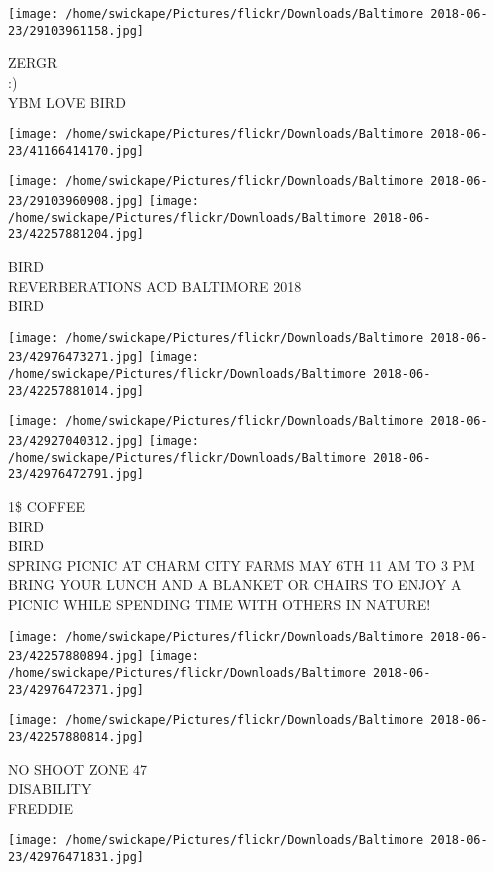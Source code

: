 \documentclass[10pt,letterpaper]{article}
\begin{document}
\texttt{[image: /home/swickape/Pictures/flickr/Downloads/Baltimore 2018-06-23/29103961158.jpg]}

ZERGR\\
:)\\
YBM LOVE BIRD
\pagebreak

\texttt{[image: /home/swickape/Pictures/flickr/Downloads/Baltimore 2018-06-23/41166414170.jpg]}

\vspace{0.25in}
\texttt{[image: /home/swickape/Pictures/flickr/Downloads/Baltimore 2018-06-23/29103960908.jpg]}
\texttt{[image: /home/swickape/Pictures/flickr/Downloads/Baltimore 2018-06-23/42257881204.jpg]}

BIRD\\
REVERBERATIONS ACD BALTIMORE 2018\\
BIRD
\pagebreak

\texttt{[image: /home/swickape/Pictures/flickr/Downloads/Baltimore 2018-06-23/42976473271.jpg]}
\texttt{[image: /home/swickape/Pictures/flickr/Downloads/Baltimore 2018-06-23/42257881014.jpg]}

\texttt{[image: /home/swickape/Pictures/flickr/Downloads/Baltimore 2018-06-23/42927040312.jpg]}
\texttt{[image: /home/swickape/Pictures/flickr/Downloads/Baltimore 2018-06-23/42976472791.jpg]}

1\$ COFFEE\\
BIRD\\
BIRD\\
SPRING PICNIC AT CHARM CITY FARMS MAY 6TH 11 AM TO 3 PM BRING YOUR LUNCH AND A BLANKET OR CHAIRS TO ENJOY A PICNIC WHILE SPENDING TIME WITH OTHERS IN NATURE!
\pagebreak

\texttt{[image: /home/swickape/Pictures/flickr/Downloads/Baltimore 2018-06-23/42257880894.jpg]}
\texttt{[image: /home/swickape/Pictures/flickr/Downloads/Baltimore 2018-06-23/42976472371.jpg]}

\texttt{[image: /home/swickape/Pictures/flickr/Downloads/Baltimore 2018-06-23/42257880814.jpg]}

NO SHOOT ZONE 47\\
DISABILITY\\
FREDDIE
\pagebreak

\texttt{[image: /home/swickape/Pictures/flickr/Downloads/Baltimore 2018-06-23/42976471831.jpg]}
\end{document}
